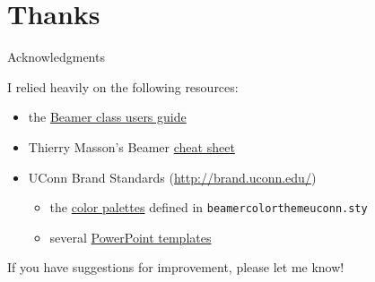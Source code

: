 \documentclass{beamer}
\begin{document}
\section{Thanks}


\begin{frame}{Acknowledgments}
\label{slide:acknowledgments}

I relied heavily on the following resources:
\begin{itemize}
\item the \href{http://texdoc.net/texmf-dist/doc/latex/beamer/doc/beameruserguide.pdf}{Beamer class users guide}
\item Thierry Masson's Beamer \href{http://www.cpt.univ-mrs.fr/~masson/latex/Beamer-appearance-cheat-sheet.pdf}{cheat sheet}
\item UConn Brand Standards (\url{http://brand.uconn.edu/})
\begin{itemize}
\item the \href{http://brand.uconn.edu/standards/color-palette/}{color palettes} defined in {\tt beamercolorthemeuconn.sty}
\item several \href{http://brand.uconn.edu/resources/powerpoint-templates/}{PowerPoint templates}
\end{itemize}
\end{itemize}

\vfill
If you have suggestions for improvement, please let me know!

\center\href{mailto:brunson@uchc.edu}{}

\end{frame}
\end{document}
